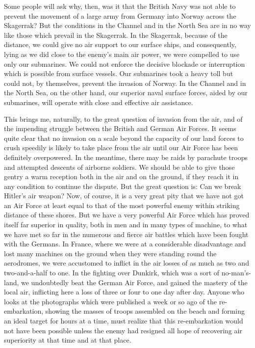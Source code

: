 \documentclass[a4paper]{amsbook}
\begin{document}
Some people will ask why, then, was it that the British Navy was not able to prevent the movement of a large army from Germany into Norway across the Skagerrak? But the conditions in the Channel and in the North Sea are in no way like those which prevail in the Skagerrak. In the Skagerrak, because of the distance, we could give no air support to our surface ships, and consequently, lying as we did close to the enemy's main air power, we were compelled to use only our submarines. We could not enforce the decisive blockade or interruption which is possible from surface vessels. Our submarines took a heavy toll but could not, by themselves, prevent the invasion of Norway. In the Channel and in the North Sea, on the other hand, our superior naval surface forces, aided by our submarines, will operate with close and effective air assistance.

This brings me, naturally, to the great question of invasion from the air, and of the impending struggle between the British and German Air Forces. It seems quite clear that no invasion on a scale beyond the capacity of our land forces to crush speedily is likely to take place from the air until our Air Force has been definitely overpowered. In the meantime, there may be raids by parachute troops and attempted descents of airborne soldiers. We should be able to give those gentry a warm reception both in the air and on the ground, if they reach it in any condition to continue the dispute. But the great question is: Can we break Hitler's air weapon? Now, of course, it is a very great pity that we have not got an Air Force at least equal to that of the most powerful enemy within striking distance of these shores. But we have a very powerful Air Force which has proved itself far superior in quality, both in men and in many types of machine, to what we have met so far in the numerous and fierce air battles which have been fought with the Germans. In France, where we were at a considerable disadvantage and lost many machines on the ground when they were standing round the aerodromes, we were accustomed to inflict in the air losses of as much as two and two-and-a-half to one. In the fighting over Dunkirk, which was a sort of no-man's-land, we undoubtedly beat the German Air Force, and gained the mastery of the local air, inflicting here a loss of three or four to one day after day. Anyone who looks at the photographs which were published a week or so ago of the re-embarkation, showing the masses of troops assembled on the beach and forming an ideal target for hours at a time, must realize that this re-embarkation would not have been possible unless the enemy had resigned all hope of recovering air superiority at that time and at that place.
\end{document}
